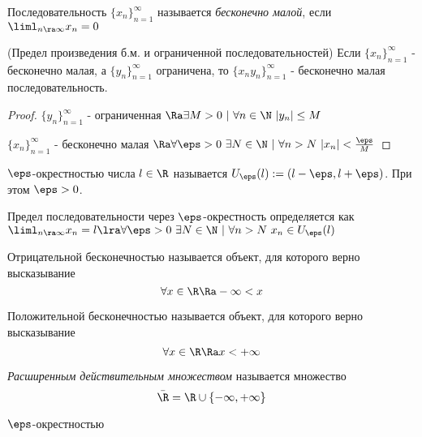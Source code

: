 \begin{definition}
	Последовательность $\{x_n\}_{n = 1}^\infty$ называется \textit{бесконечно малой}, если $\liml_{n \ra \infty} x_n = 0$ 
\end{definition}

\begin{theorem} (Предел произведения б.м. и ограниченной последовательностей)
	Если $\{x_n\}_{n = 1}^\infty$ - бесконечно малая, а $\{y_n\}_{n = 1}^\infty$ ограничена, то $\{x_ny_n\}_{n = 1}^\infty$ - бесконечно малая последовательность.
\end{theorem}

\begin{proof}
	$\{y_n\}_{n = 1}^\infty$ - ограниченная $\Ra \exists M > 0\ |\ \forall n \in \N\ |y_n| \le M$
	
	$\{x_n\}_{n = 1}^\infty$ - бесконечно малая $\Ra \forall \eps > 0\ \exists N \in \N\ |\ \forall n > N\ |x_n| < \frac{\eps}{M}$
\end{proof}

\begin{definition}
	$\eps$-окрестностью числа $l \in \R$ называется $U_{\eps}(l) := (l - \eps, l + \eps)$. При этом $\eps > 0$.
\end{definition}

\begin{definition}
	Предел последовательности через $\eps$-окрестность определяется как $\liml_{n \ra \infty} x_n = l \lra \forall \eps > 0\ \exists N \in \N\ |\ \forall n > N\ x_n \in U_{\eps}(l)$
\end{definition}

\begin{definition}
	Отрицательной бесконечностью называется объект, для которого верно высказывание
	$$
		\forall x \in \R \Ra -\infty < x
	$$
\end{definition}

\begin{definition}
	Положительной бесконечностью называется объект, для которого верно высказывание
	$$
		\forall x \in \R \Ra x < +\infty
	$$
\end{definition}

\begin{definition}
	\textit{Расширенным действительным множеством} называется множество
	$$
		\bar{\R} = \R \cup \{-\infty, +\infty\}
	$$
\end{definition}

\begin{definition}
	$\eps$-окрестностью 
\end{definition}

